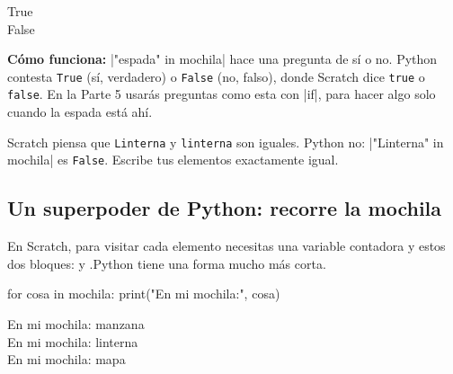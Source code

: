\begin{outputbox}
True\\
False
\end{outputbox}

\textbf{Cómo funciona:} \py|"espada" in mochila| hace una pregunta de sí o no. Python contesta \texttt{True} (sí, verdadero) o \texttt{False} (no, falso), donde Scratch dice \texttt{true} o \texttt{false}. En la Parte 5 usarás preguntas como esta con \py|if|, para hacer algo solo cuando la espada está ahí.

\begin{watchout}
Scratch piensa que \texttt{Linterna} y \texttt{linterna} son iguales. Python no: \py|"Linterna" in mochila| es \texttt{False}. Escribe tus elementos exactamente igual.
\end{watchout}

\subsection*{Un superpoder de Python: recorre la mochila}

En Scratch, para visitar cada elemento necesitas una variable contadora y estos dos bloques:\newline {} y .\newline Python tiene una forma mucho más corta.

\begin{center}
\begin{scratch}
\end{scratch}
\end{center}
\begin{code}
for cosa in mochila:
    print("En mi mochila:", cosa)
\end{code}

\begin{outputbox}
En mi mochila: manzana\\
En mi mochila: linterna\\
En mi mochila: mapa
\end{outputbox}

